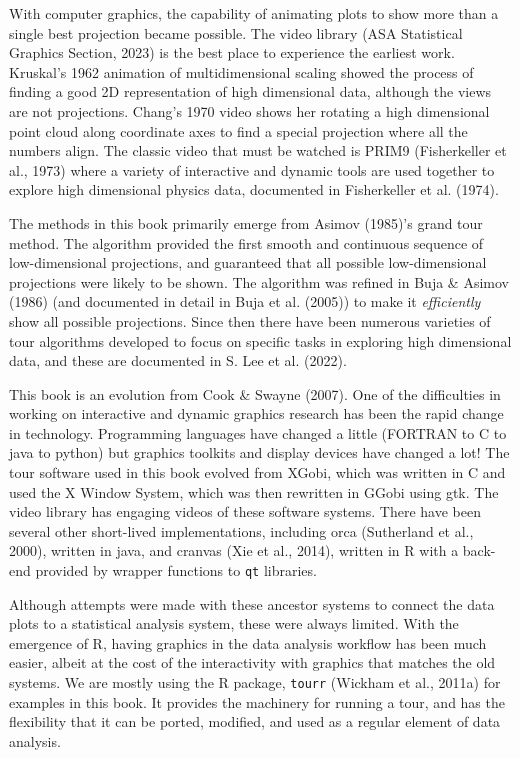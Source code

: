 \documentclass[
  letterpaper,
]{krantz}
\begin{document}
With computer graphics, the capability of animating plots to show more
than a single best projection became possible. The video library (ASA
Statistical Graphics Section, 2023) is the best place to experience the
earliest work. Kruskal's 1962 animation of multidimensional scaling
showed the process of finding a good 2D representation of high
dimensional data, although the views are not projections. Chang's 1970
video shows her rotating a high dimensional point cloud along coordinate
axes to find a special projection where all the numbers align. The
classic video that must be watched is PRIM9 (Fisherkeller et al., 1973)
where a variety of interactive and dynamic tools are used together to
explore high dimensional physics data, documented in Fisherkeller et al.
(1974).

The methods in this book primarily emerge from Asimov (1985)'s grand
tour method. The algorithm provided the first smooth and continuous
sequence of low-dimensional projections, and guaranteed that all
possible low-dimensional projections were likely to be shown. The
algorithm was refined in Buja \& Asimov (1986) (and documented in detail
in Buja et al. (2005)) to make it \emph{efficiently} show all possible
projections. Since then there have been numerous varieties of tour
algorithms developed to focus on specific tasks in exploring high
dimensional data, and these are documented in S. Lee et al. (2022).

This book is an evolution from Cook \& Swayne (2007). One of the
difficulties in working on interactive and dynamic graphics research has
been the rapid change in technology. Programming languages have changed
a little (FORTRAN to C to java to python) but graphics toolkits and
display devices have changed a lot! The tour software used in this book
evolved from XGobi, which was written in C and used the X Window System,
which was then rewritten in GGobi using gtk. The video library has
engaging videos of these software systems. There have been several other
short-lived implementations, including orca (Sutherland et al., 2000),
written in java, and cranvas (Xie et al., 2014), written in R with a
back-end provided by wrapper functions to \texttt{qt} libraries.

Although attempts were made with these ancestor systems to connect the
data plots to a statistical analysis system, these were always limited.
With the emergence of R, having graphics in the data analysis workflow
has been much easier, albeit at the cost of the interactivity with
graphics that matches the old systems. We are mostly using the R
package, \texttt{tourr} (Wickham et al., 2011a) for examples in this
book. It provides the machinery for running a tour, and has the
flexibility that it can be ported, modified, and used as a regular
element of data analysis.
\end{document}
